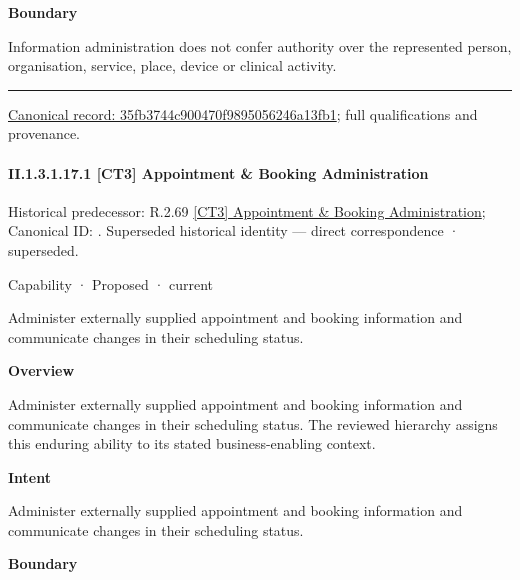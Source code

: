 \textbf{Boundary}



Information administration does not confer authority over the represented person, organisation, service, place, device or clinical activity.



\medskip\hrule\medskip

{\footnotesize \href{../../../../../../../continuum/strategy/capability/35fb3744c900470f9895056246a13fb1.md}{Canonical record: 35fb3744c900470f9895056246a13fb1}; full qualifications and provenance.}\par
\paragraph*{II.1.3.1.17.1 [CT3] Appointment \& Booking Administration}
\label{navigation:II.1.3.1.17.1}

{\small Historical predecessor: R.2.69 \hyperref[element:cdc16dd0f84049f8af3f1ec76f1e1428]{[CT3] Appointment \& Booking Administration}; Canonical ID: \texttt{}. Superseded historical identity — direct correspondence · superseded.}\par
\label{element:7b3ba9bcac564dd4a7a08631581db2ca}
{\small Capability · Proposed · current}\par

Administer externally supplied appointment and booking information and communicate changes in their scheduling status.



\textbf{Overview}



Administer externally supplied appointment and booking information and communicate changes in their scheduling status. The reviewed hierarchy assigns this enduring ability to its stated business-enabling context.



\textbf{Intent}



Administer externally supplied appointment and booking information and communicate changes in their scheduling status.



\textbf{Boundary}



